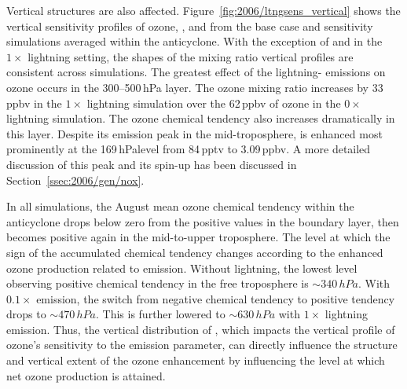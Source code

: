 Vertical structures are also affected. Figure~\ref{fig:2006/ltngsens_vertical} shows the vertical sensitivity profiles of ozone,
, and  from the base case and sensitivity simulations averaged within the anticyclone.
With the exception of  and  in the $1\times$ lightning setting, the
shapes of the mixing ratio vertical profiles are consistent across simulations. The greatest effect of the lightning-
emissions on ozone occurs in the 300--500\,\unit{hPa} layer. The ozone mixing ratio increases by 33\,\unit{ppbv} in the $1\times$
lightning simulation over the 62\,\unit{ppbv} of ozone in the $0\times$ lightning simulation. The ozone chemical tendency
also increases dramatically in this layer. Despite its {\lnox} emission peak in the mid-troposphere,
 is enhanced most prominently at the 169\,\unit{hPa}level  from 84\,\unit{pptv} to 3.09\,\unit{ppbv}. A more detailed
discussion of this peak and its spin-up has been discussed in Section~\ref{ssec:2006/gen/nox}.

In all simulations, the August mean ozone chemical tendency within the anticyclone drops below zero from the
positive values in the boundary layer, then becomes positive again in the mid-to-upper troposphere. The level
at which the sign of the accumulated chemical tendency changes according to the enhanced ozone production
related to {\lnox} emission. Without lightning, the lowest level observing positive chemical tendency in the free
troposphere is $\sim340\,\unit{hPa}$. With $0.1\times$ {\lnox} emission, the switch from negative chemical tendency
to positive tendency drops to $\sim470\,\unit{hPa}$. This is further lowered to $\sim630\,\unit{hPa}$ with $1\times$
lightning emission. Thus, the vertical distribution of {\lnox}, which impacts the vertical profile of ozone's sensitivity
to the emission parameter, can directly influence the structure and vertical extent of the ozone enhancement by
influencing the level at which net ozone production is attained.

